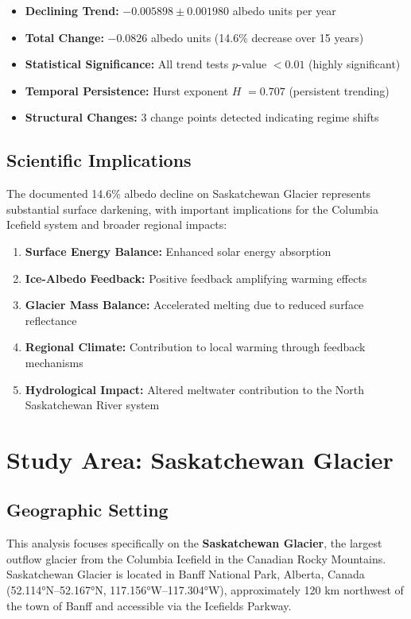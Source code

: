 \documentclass[12pt,a4paper]{article}
\newcommand{\pvalue}{$p$-value}
\newcommand{\hurst}{$H$}
\begin{document}
\begin{itemize}
    \item \textbf{Declining Trend:} $-0.005898 \pm 0.001980$ albedo units per year
    \item \textbf{Total Change:} $-0.0826$ albedo units (14.6\% decrease over 15 years)
    \item \textbf{Statistical Significance:} All trend tests \pvalue{} $< 0.01$ (highly significant)
    \item \textbf{Temporal Persistence:} Hurst exponent \hurst{} $= 0.707$ (persistent trending)
    \item \textbf{Structural Changes:} 3 change points detected indicating regime shifts
\end{itemize}

\subsection{Scientific Implications}

The documented 14.6\% albedo decline on Saskatchewan Glacier represents substantial surface darkening, with important implications for the Columbia Icefield system and broader regional impacts:
\begin{enumerate}
    \item \textbf{Surface Energy Balance:} Enhanced solar energy absorption
    \item \textbf{Ice-Albedo Feedback:} Positive feedback amplifying warming effects  
    \item \textbf{Glacier Mass Balance:} Accelerated melting due to reduced surface reflectance
    \item \textbf{Regional Climate:} Contribution to local warming through feedback mechanisms
    \item \textbf{Hydrological Impact:} Altered meltwater contribution to the North Saskatchewan River system
\end{enumerate}

\section{Study Area: Saskatchewan Glacier}

\subsection{Geographic Setting}

This analysis focuses specifically on the \textbf{Saskatchewan Glacier}, the largest outflow glacier from the Columbia Icefield in the Canadian Rocky Mountains. Saskatchewan Glacier is located in Banff National Park, Alberta, Canada (52.114°N--52.167°N, 117.156°W--117.304°W), approximately 120 km northwest of the town of Banff and accessible via the Icefields Parkway.
\end{document}
